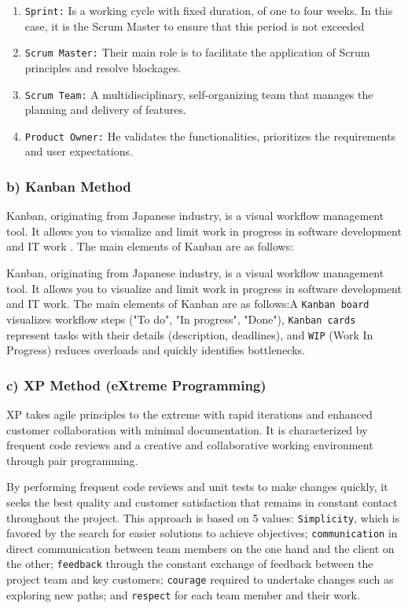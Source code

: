 \begin{enumerate}[label=\textbf{-}]
    \item \texttt{Sprint:} Is a working cycle with fixed duration, of one to four weeks. In this case, it is the Scrum Master to ensure that this period is not exceeded \cite{schwaber2004agile}

    \item \texttt{Scrum Master:} Their main role is to facilitate the application of Scrum principles and resolve blockages.

    \item \texttt{Scrum Team:} A multidisciplinary, self-organizing team that manages the planning and delivery of features.


    \item \texttt{Product Owner:} He validates the functionalities, prioritizes the requirements and user expectations.

    
\end{enumerate}
\subsubsection{b) Kanban Method}
Kanban, originating from Japanese industry, is a visual workflow management tool. It allows you to visualize and limit work in progress in software development and IT work . The main elements of Kanban are as follows:

Kanban, originating from Japanese industry, is a visual workflow management tool. It allows you to visualize and limit work in progress in software development and IT work\cite{anderson2010kanban}. The main elements of Kanban are as follows:A \texttt{Kanban board} visualizes workflow steps ("To do", "In progress", "Done"), \texttt{Kanban cards} represent tasks with their details (description, deadlines), and \texttt{WIP} (Work In Progress) reduces overloads and quickly identifies bottlenecks.

\subsubsection{c) XP Method (eXtreme Programming)}

XP takes agile principles to the extreme with rapid iterations and enhanced customer collaboration with minimal documentation. It is characterized by frequent code reviews and a creative and collaborative working environment through pair programming\cite{beck2000extreme}. 


By performing frequent code reviews and unit tests to make changes quickly, it seeks the best quality and customer satisfaction that remains in constant contact throughout the project. This approach is based on 5 values: \texttt{Simplicity}, which is favored by the search for easier solutions to achieve objectives; \texttt{communication} in direct communication between team members on the one hand and the client on the other; \texttt{feedback} through the constant exchange of feedback between the project team and key customers; \texttt{courage} required to undertake changes such as exploring new paths; and \texttt{respect} for each team member and their work.


